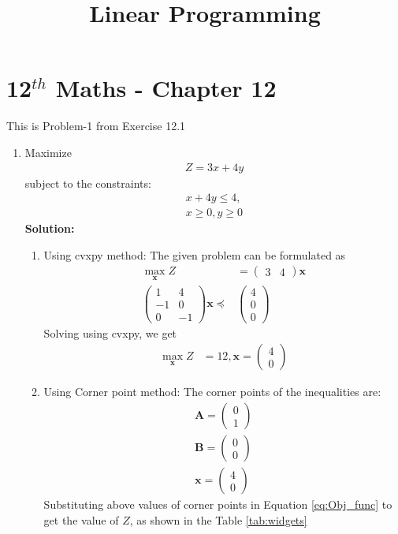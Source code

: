 \documentclass[12pt]{article}
\newcommand{\solution}{\noindent \textbf{Solution: }}
\newcommand{\myvec}[1]{\ensuremath{\begin{pmatrix}#1\end{pmatrix}}}
\let\vec\mathbf
\begin{document}
\begin{center}
\title{\textbf{Linear Programming}}
\date{\vspace{-5ex}} %
\maketitle
\end{center}
\setcounter{page}{1}

\section{12$^{th}$ Maths - Chapter 12}
This is Problem-1 from Exercise 12.1
\begin{enumerate}
\item Maximize
\begin{align}
	\label{eq:Obj_func}
	Z = 3x + 4y
\end{align}
subject to the constraints:
\begin{align}
	x+4y \leq 4, \\ 
	x \geq 0, y \geq 0
\end{align}
\solution 
\begin{enumerate}
\item Using cvxpy method: The given problem can be formulated as 
\begin{align}
	\max_{\vec{x}} Z &= \myvec{3 & 4}\vec{x} \\
        \myvec{1 & 4\\
               -1 &0\\
	       0 & -1}\vec{x}\preceq & \myvec{4 \\0\\0}
\end{align}
Solving using cvxpy, we get
\begin{align}
	\label{eq:maxval}
	\max_{\vec{x}} Z &= 12 , 
	\vec{x} = \myvec{4  \\  0} 
\end{align}
\item Using Corner point method: The corner points of  the inequalities are:
\begin{align}
	\vec{A} = \myvec{0 \\ 1}\\
	\vec{B} = \myvec{0 \\ 0} \\
	\vec{x} = \myvec{4 \\ 0} 
\end{align}
Substituting above values of corner points in Equation \eqref{eq:Obj_func} to get the value of $Z$, as shown in the Table \ref{tab:widgets}
\begin{table}[!h]
	\centering
	 
	\caption{\label{tab:widgets}}
\end{table}


\end{enumerate}
\end{enumerate}
\end{document}
